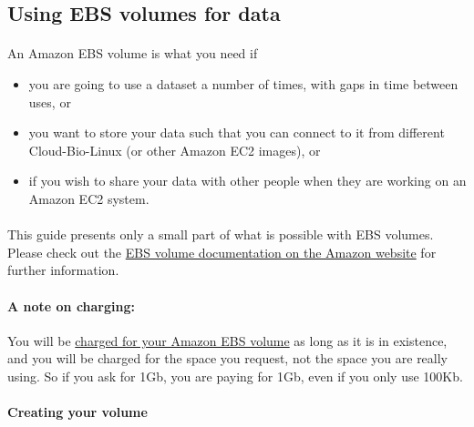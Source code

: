 \subsection{Using EBS volumes for data}

\paragraph{}An Amazon EBS volume is what you need if 
\begin{itemize}
\item you are going to use a dataset a number of times, with gaps in time between uses, or
\item you want to store your data such that you can connect to it from different Cloud-Bio-Linux (or other Amazon EC2 images), or
\item if you wish to share your data with other people when they are working on an Amazon EC2 system.
\end{itemize}

\paragraph{}This guide presents only a small part of what is possible with EBS volumes. Please check out the \href{http://docs.amazonwebservices.com/AWSEC2/latest/UserGuide/ebs-api-overview.html}{EBS volume documentation on the Amazon website} for further information.

\paragraph{A note on charging:}You will be \href{http://aws.amazon.com/ec2/}{charged for your Amazon EBS volume} as long as it is in existence, and you will be charged for the space you request, not the space you are really using. So if you ask for 1Gb, you are paying for 1Gb, even if you only use 100Kb. 

\paragraph{Creating your volume}

